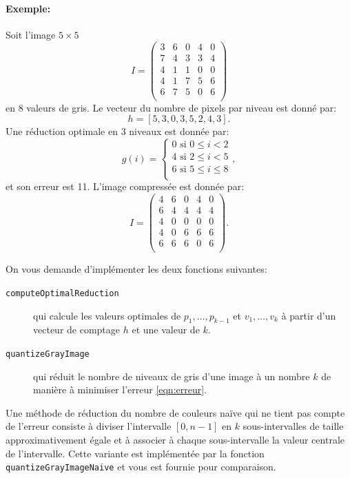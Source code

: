 \documentclass[a4paper,10pt]{article}
\begin{document}
\paragraph{Exemple:} Soit l'image $5\times 5$
$$I=\left(\begin{matrix}
     3 & 6 & 0 & 4 & 0\\
     7 & 4 & 3 & 3 & 4\\
     4 & 1 & 1 & 0 & 0\\
     4 & 1 & 7 & 5 & 6\\
     6 & 7 & 5 & 0 & 6\\
\end{matrix}\right)
$$
en 8 valeurs de gris. Le vecteur du nombre de pixels par niveau est donné par:
$$h=[5,3,0,3,5,2,4,3].$$ Une réduction optimale en 3 niveaux est donnée par:
\[g(i)=\left\{
\begin{array}{ll}
0\mbox{ si }0\leq i<2\\
4\mbox{ si }2\leq i < 5\\
6\mbox{ si }5\leq i\leq 8\\
\end{array}
\right.,
\]
et son erreur est 11. L'image compressée est donnée par:
$$
\hat{I}=\left(\begin{matrix}
  4 & 6 & 0 & 4 & 0\\
  6 & 4 & 4 & 4 & 4\\
  4 & 0 & 0 & 0 & 0\\
  4 & 0 & 6 & 6 & 6\\
  6 & 6 & 6 & 0 & 6\\
\end{matrix}\right).
$$


On vous demande d'implémenter les deux fonctions suivantes:
\begin{description}
\item[\texttt{computeOptimalReduction}] qui calcule les valeurs optimales de $p_1,\ldots,p_{k-1}$ et $v_1,\ldots,v_k$ à partir d'un vecteur de comptage $h$ et une valeur de $k$.
\item[\texttt{quantizeGrayImage}] qui réduit le nombre de niveaux de gris d'une image à un nombre $k$ de manière à minimiser l'erreur \ref{eqn:erreur}.
\end{description}

Une méthode de réduction du nombre de couleurs naïve qui ne tient pas
compte de l'erreur consiste à diviser l'intervalle $[0,n-1]$ en $k$
sous-intervalles de taille approximativement égale et à associer à
chaque sous-intervalle la valeur centrale de l'intervalle. Cette
variante est implémentée par la fonction
\texttt{quantizeGrayImageNaive} et vous est fournie pour comparaison.
\end{document}
